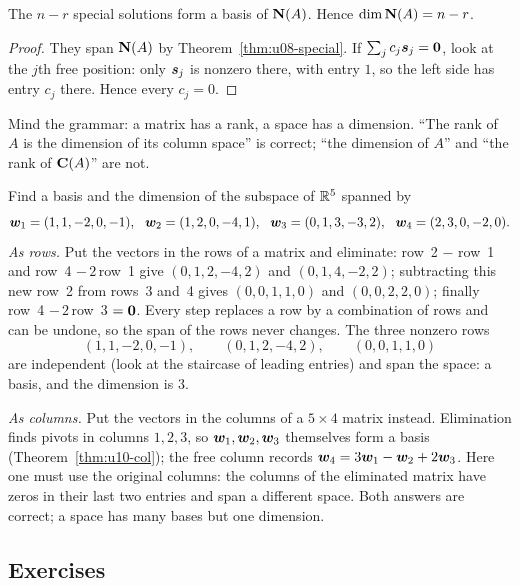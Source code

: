 \begin{theorem}\label{thm:u10-null}
The $n-r$ special solutions form a basis of $\mathbf{N}(A)$. Hence $\dim\mathbf{N}(A)=n-r$.
\end{theorem}
\begin{proof}
They span $\mathbf{N}(A)$ by Theorem~\ref{thm:u08-special}. If $\sum_j c_j\boldsymbol{s}_j=\boldsymbol{0}$, look at the
$j$th free position: only $\boldsymbol{s}_j$ is nonzero there, with entry $1$, so the left side has entry
$c_j$ there. Hence every $c_j=0$.
\end{proof}

Mind the grammar: a matrix has a rank, a space has a dimension. ``The rank of $A$ is the dimension
of its column space'' is correct; ``the dimension of $A$'' and ``the rank of $\mathbf{C}(A)$'' are not.

\begin{example}\label{ex:u10-span}
Find a basis and the dimension of the subspace of $\mathbb{R}^5$ spanned by
\[
\vb{w}_1=(1,1,-2,0,-1),\ \ \vb{w}_2=(1,2,0,-4,1),\ \ \vb{w}_3=(0,1,3,-3,2),\ \ \vb{w}_4=(2,3,0,-2,0).
\]
\emph{As rows.} Put the vectors in the rows of a matrix and eliminate: row~2 $-$ row~1 and
row~4 $-\,2\,$row~1 give $(0,1,2,-4,2)$ and $(0,1,4,-2,2)$; subtracting this new row~2 from rows~3
and~4 gives $(0,0,1,1,0)$ and $(0,0,2,2,0)$; finally row~4 $-\,2\,$row~3 $=\boldsymbol{0}$. Every step
replaces a row by a combination of rows and can be undone, so the span of the rows never changes.
The three nonzero rows
\[
(1,1,-2,0,-1),\qquad(0,1,2,-4,2),\qquad(0,0,1,1,0)
\]
are independent (look at the staircase of leading entries) and span the space: a basis, and the
dimension is $3$.

\emph{As columns.} Put the vectors in the columns of a $5\times4$ matrix instead. Elimination
finds pivots in columns $1,2,3$, so $\boldsymbol{w}_1,\boldsymbol{w}_2,\boldsymbol{w}_3$ themselves form a basis
(Theorem~\ref{thm:u10-col}); the free column records $\boldsymbol{w}_4=3\boldsymbol{w}_1-\boldsymbol{w}_2+2\boldsymbol{w}_3$. Here
one must use the original columns: the columns of the eliminated matrix have zeros in their last two
entries and span a different space. Both answers are correct; a space has many bases but one
dimension.
\end{example}

\subsection{Exercises}

